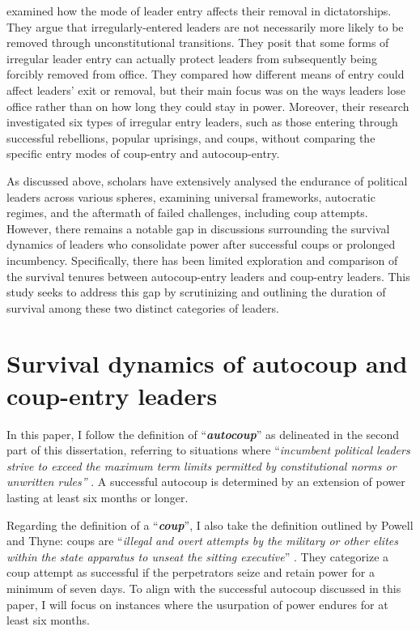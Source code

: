 \documentclass[
  12pt,
  a4paper,
  12pt]{article}
\begin{document}
\citet{sudduth2018} examined how the mode of leader entry affects their
removal in dictatorships. They argue that irregularly-entered leaders
are not necessarily more likely to be removed through unconstitutional
transitions. They posit that some forms of irregular leader entry can
actually protect leaders from subsequently being forcibly removed from
office. They compared how different means of entry could affect leaders'
exit or removal, but their main focus was on the ways leaders lose
office rather than on how long they could stay in power. Moreover, their
research investigated six types of irregular entry leaders, such as
those entering through successful rebellions, popular uprisings, and
coups, without comparing the specific entry modes of coup-entry and
autocoup-entry.

As discussed above, scholars have extensively analysed the endurance of
political leaders across various spheres, examining universal
frameworks, autocratic regimes, and the aftermath of failed challenges,
including coup attempts. However, there remains a notable gap in
discussions surrounding the survival dynamics of leaders who consolidate
power after successful coups or prolonged incumbency. Specifically,
there has been limited exploration and comparison of the survival
tenures between autocoup-entry leaders and coup-entry leaders. This
study seeks to address this gap by scrutinizing and outlining the
duration of survival among these two distinct categories of leaders.

\newpage

\section{Survival dynamics of autocoup and coup-entry
leaders}\label{survival-dynamics-of-autocoup-and-coup-entry-leaders}

In this paper, I follow the definition of ``\textbf{\emph{autocoup}}''
as delineated in the second part of this dissertation, referring to
situations where ``\emph{incumbent political leaders strive to exceed
the maximum term limits permitted by constitutional norms or unwritten
rules''} \citep[p5]{zhu2024}. A successful autocoup is determined by an
extension of power lasting at least six months or longer.

Regarding the definition of a ``\textbf{\emph{coup}}'', I also take the
definition outlined by Powell and Thyne: coups are ``\emph{illegal and
overt attempts by the military or other elites within the state
apparatus to unseat the sitting executive}'' \citep[p252]{powell2011}.
They categorize a coup attempt as successful if the perpetrators seize
and retain power for a minimum of seven days. To align with the
successful autocoup discussed in this paper, I will focus on instances
where the usurpation of power endures for at least six months.
\end{document}
